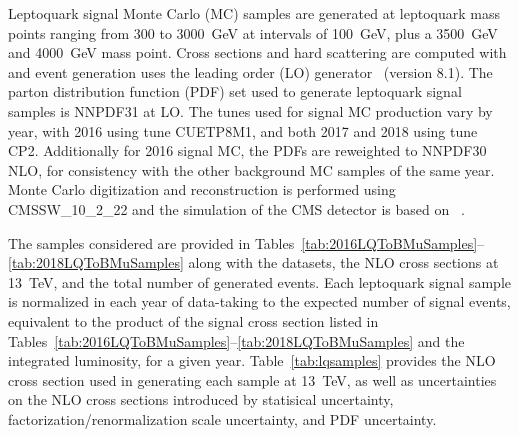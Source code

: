 Leptoquark signal Monte Carlo (MC) samples are generated at leptoquark mass points ranging from 300 to \SI{3000}{\GeV} at intervals of \SI{100}{\GeV}, plus a \SI{3500}{\GeV} and \SI{4000}{\GeV} mass point. Cross sections and hard scattering are computed with \MGvATNLO and event generation uses the leading order (LO) \PYTHIA generator~\cite{PYTHIA,pythia8} (version 8.1). The parton distribution function (PDF) set used to generate leptoquark signal samples is NNPDF31 at LO. The tunes used for signal MC production vary by year, with 2016 using tune CUETP8M1, and both 2017 and 2018 using tune CP2. Additionally for 2016 signal MC, the PDFs are reweighted to NNPDF30 NLO, for consistency with the other background MC samples of the same year. Monte Carlo digitization and reconstruction is performed using {CMSSW\_10\_2\_22} and the simulation of the CMS detector is based on \GEANTfour~\cite{GEANT4}.

The \LQToBMuPair samples considered are provided in Tables~\ref{tab:2016LQToBMuSamples}--\ref{tab:2018LQToBMuSamples} along with the datasets, the NLO cross sections at \SI{13}{\TeV}, and the total number of generated events. Each leptoquark signal sample is normalized in each year of data-taking to the expected number of signal events, equivalent to the product of the signal cross section listed in Tables~\ref{tab:2016LQToBMuSamples}--\ref{tab:2018LQToBMuSamples} and the integrated luminosity, for a given year. Table~\ref{tab:lqsamples} provides the NLO cross section used in generating each \LQToBMuPair sample at \SI{13}{\TeV}, as well as uncertainties on the NLO cross sections introduced by statisical uncertainty, factorization/renormalization scale uncertainty, and PDF uncertainty.

